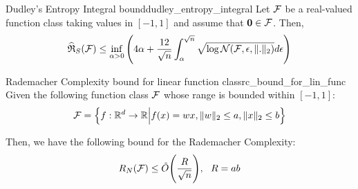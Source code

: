 \begin{theorem}{Dudley's Entropy Integral bound}{dudley_entropy_integral}
    Let $\mathcal{F}$ be a real-valued function class taking values in $[-1, 1]$ and assume that ${\bf 0}\in\mathcal{F}$. Then,
    \begin{align*}
        \widehat{\mathfrak{R}}_S(\mathcal{F}) \le \inf_{\alpha>0} \Bigg( 
            4\alpha + \frac{12}{\sqrt n}\int_\alpha^{\sqrt n} \sqrt{
                \log\mathcal{N}(\mathcal{F}, \epsilon,\|.\|_2)
            }d\epsilon
         \Bigg)
    \end{align*}
\end{theorem}
\begin{proof*}
    
\end{proof*}


\begin{proposition}{Rademacher Complexity bound for linear function class}{rc_bound_for_lin_func}
    Given the following function class $\mathcal{F}$ whose range is bounded within $[-1, 1]$:
    \begin{align*}
        \mathcal{F} = \Big\{ 
            f:\mathbb{R}^d\to\mathbb{R} \Big| f(x) = wx, \|w\|_2 \le a, \|x\|_2 \le b
         \Big\}
    \end{align*}

    \noindent Then, we have the following bound for the Rademacher Complexity:
    \begin{align*}
        R_N(\mathcal{F}) \le \tilde O \Bigg( \frac{R}{\sqrt{n}} \Bigg), \ \ R = ab
    \end{align*}
\end{proposition}

